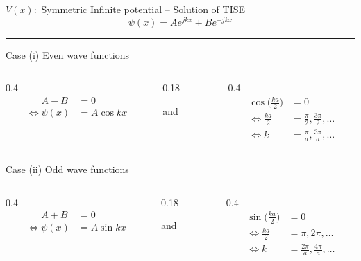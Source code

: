 \begin{frame}{\(V(x) :\) Symmetric Infinite potential -- Solution of TISE}
	\[
	\psi(x)  = A e^{j k x} + B e^{-j k x}
	\]
	\hrule
	\begin{center}
		Case (i) Even wave functions
	\end{center}
	\vspace{-5ex}
	\begin{columns}[t]
		\begin{column}[t]{0.4\textwidth}
			\begin{align*}
				\phantom{\Leftrightarrow} A-B &= 0	\\
				\Leftrightarrow \psi(x)  &= A \cos k x
			\end{align*}
		\end{column}
		\begin{column}{0.18\textwidth}
			\begin{center}
				and
			\end{center}
		\end{column}
		\begin{column}[t]{0.4\textwidth}
			\begin{align*}
				\cos \big( \frac{ka}{2}\big) &= 0	\\
				\Leftrightarrow	\frac{ka}{2} &= \frac{\pi}{2}, \frac{3\pi}{2}, \ldots	\\
				\Leftrightarrow	k &= \frac{\pi}{a}, \frac{3\pi}{a}, \ldots
			\end{align*}
		\end{column}
	\end{columns}
	\begin{center}
		Case (ii) Odd wave functions
	\end{center}
	\vspace{-5ex}
	\begin{columns}[t]
		\begin{column}[t]{0.4\textwidth}
			\begin{align*}
				\phantom{\Leftrightarrow} A+B &= 0	\\
				 \Leftrightarrow \psi(x)  &= A \sin k x
			\end{align*}
		\end{column}
		\begin{column}{0.18\textwidth}
			\begin{center}
				and
			\end{center}
		\end{column}
		\begin{column}[t]{0.4\textwidth}
			\begin{align*}
				\sin \big( \frac{ka}{2}\big) &= 0	\\
				\Leftrightarrow	 \frac{ka}{2} &= \pi, 2\pi, \ldots \\
				\Leftrightarrow	k &= \frac{2\pi}{a}, \frac{4\pi}{a}, \ldots
			\end{align*}
		\end{column}
	\end{columns}
\end{frame}
